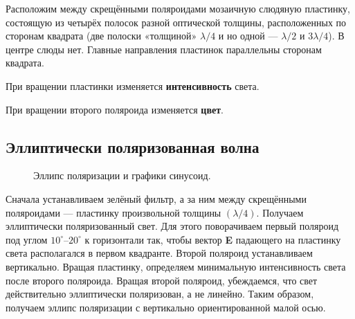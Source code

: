 Расположим между скрещёнными поляроидами мозаичную слюдяную пластинку, состоящую из четырёх полосок разной оптической толщины, расположенных по сторонам квадрата (две полоски «толщиной» $ \lambda / 4 $ и но одной — $ \lambda / 2 $ и $ 3 \lambda / 4 $). В центре слюды нет. Главные направления пластинок параллельны сторонам квадрата.  

При вращении пластинки изменяется \textbf{интенсивность} света.

При вращении второго поляроида изменяется \textbf{цвет}.

\subsection*{Эллиптически поляризованная волна}

\begin{figure}[h]
	\caption{\centering Эллипс поляризации и графики синусоид.}
	\label{pic:5}
\end{figure}

Сначала устанавливаем зелёный фильтр, а за ним между скрещёнными поляроидами --- пластинку произвольной толщины $ (\lambda / 4) $. Получаем эллиптически поляризованный свет. Для этого поворачиваем первый поляроид под углом $ 10^\circ $–$ 20^\circ $ к горизонтали так, чтобы вектор \textbf{E} падающего на пластинку света располагался в первом квадранте. Второй поляроид устанавливаем вертикально. Вращая пластинку, определяем минимальную интенсивность света после второго поляроида. Вращая второй поляроид, убеждаемся, что свет действительно эллиптически поляризован, а не линейно. Таким образом, получаем эллипс поляризации с вертикально ориентированной малой осью.

